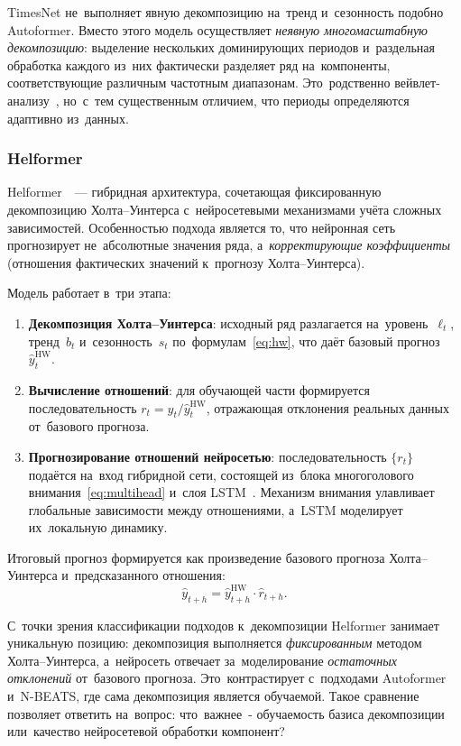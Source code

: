 TimesNet не~выполняет явную декомпозицию на~тренд и~сезонность подобно
Autoformer.  Вместо этого модель осуществляет \textit{неявную
многомасштабную декомпозицию}: выделение нескольких доминирующих
периодов и~раздельная обработка каждого из~них фактически разделяет
ряд на~компоненты, соответствующие различным частотным диапазонам.
Это~родственно вейвлет-анализу~\cite{percival2000wavelet}, но~с~тем
существенным отличием, что периоды определяются адаптивно из~данных.


\subsubsection{Helformer}
\label{sssec:helformer}

Helformer~\cite{kehinde2025helformer}~--- гибридная архитектура,
сочетающая фиксированную декомпозицию Холта--Уинтерса с~нейросетевыми
механизмами учёта сложных зависимостей.  Особенностью подхода является
то, что нейронная сеть прогнозирует не~абсолютные значения ряда,
а~\textit{корректирующие коэффициенты} (отношения фактических значений
к~прогнозу Холта--Уинтерса).

Модель работает в~три этапа:
\begin{enumerate}[nosep]
\item \textbf{Декомпозиция Холта--Уинтерса}:
   исходный ряд разлагается на~уровень~$\ell_t$, тренд~$b_t$
   и~сезонность~$s_t$ по~формулам~\eqref{eq:hw}, что даёт
   базовый прогноз $\hat{y}_t^{\mathrm{HW}}$.
\item \textbf{Вычисление отношений}:
   для обучающей части формируется последовательность
   $r_t = y_t / \hat{y}_t^{\mathrm{HW}}$, отражающая отклонения
   реальных данных от~базового прогноза.
\item \textbf{Прогнозирование отношений нейросетью}:
   последовательность $\{r_t\}$ подаётся на~вход гибридной сети,
   состоящей из~блока многоголового внимания~\eqref{eq:multihead}
   и~слоя LSTM~\cite{hochreiter1997lstm}.  Механизм внимания
   улавливает глобальные зависимости между отношениями, а~LSTM
   моделирует их~локальную динамику.
\end{enumerate}
Итоговый прогноз формируется как произведение базового прогноза
Холта--Уинтерса и~предсказанного отношения:
\begin{equation}
\label{eq:helformer}
\hat{y}_{t+h} = \hat{y}_{t+h}^{\mathrm{HW}} \cdot \hat{r}_{t+h}.
\end{equation}

С~точки зрения классификации подходов к~декомпозиции Helformer
занимает уникальную позицию: декомпозиция выполняется \textit{фиксированным}
методом Холта--Уинтерса, а~нейросеть отвечает за~моделирование
\textit{остаточных отклонений} от~базового прогноза.  Это~контрастирует
с~подходами Autoformer и~N-BEATS, где сама декомпозиция является
обучаемой.  Такое сравнение позволяет ответить на~вопрос: что~важнее~-
обучаемость базиса декомпозиции или~качество нейросетевой обработки
компонент?

